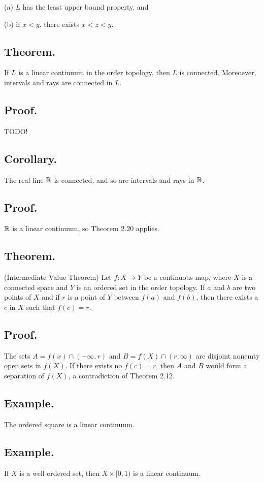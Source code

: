 \documentclass[titlepage]{article}
\begin{document}
(a) $L$ has the least upper bound property, and 

(b) if $x < y$, there exists $x < z < y$.

\subsection{Theorem.} If $L$ is a linear continuum in the order topology, then $L$ is connected. Moreoever, intervals and rays are connected in $L$.

\subsection{Proof.} TODO!

\subsection{Corollary.} The real line $\mathbb{R}$ is connected, and so are intervals and rays in $\mathbb{R}$.

\subsection{Proof.} $\mathbb{R}$ is a linear continuum, so Theorem 2.20 applies.

\subsection{Theorem.} (Intermediate Value Theorem) Let $f: X \to Y$ be a continuous map, where $X$ is a connected space and $Y$ is an ordered set in the order topology. If $a$ and $b$ are two points of $X$ and if $r$ is a point of $Y$ between $f(a)$ and $f(b)$, then there exists a $c$ in $X$ such that $f(c) = r$.

\subsection{Proof.} The sets $A = f(x) \cap (-\infty, r)$ and $B = f(X) \cap (r, \infty)$ are disjoint nonemty open sets in $f(X)$. If there exists no $f(c) = r$, then $A$ and $B$ would form a separation of $f(X)$, a contradiction of Theorem 2.12.

\subsection{Example.} The ordered square is a linear continuum.

\subsection{Example.} If $X$ is a well-ordered set, then $X \times [0, 1)$ is a linear continuum.
\end{document}
